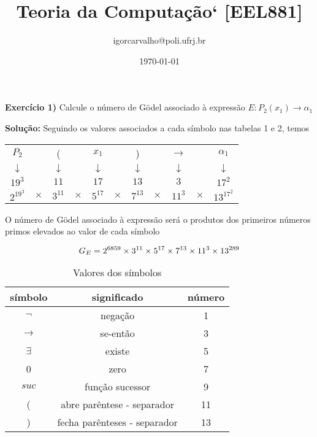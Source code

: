 \documentclass{article}
\title{Teoria da Computação` [EEL881]}
\author{igorcarvalho@poli.ufrj.br}
\date{\today}
\begin{document}
\maketitle

\noindent \textbf{Exercício 1)} Calcule o número de Gödel associado à expressão $E: P_2(x_1) \to \alpha_1$

\hspace{0pt}

\noindent \textbf{Solução:} Seguindo os valores associados a cada símbolo nas tabelas 1 e 2, temos

\begin{center}
    \begin{tabular}{ccccccccccc}
        $P_2$ & & ( & & $x_1$ & & ) & & $\to$ & & $\alpha_1$\\
        $\downarrow$ & & $\downarrow$ & & $\downarrow$ & & $\downarrow$ & & $\downarrow$ & & $\downarrow$\\
        $19^3$ & & $11$ & & $17$ & & $13$ & & $3$ & & $17^2$\\
        $2^{19^3}$ & $\times$ & $3^{11}$ & $\times$ & $5^{17}$ & $\times$ & $7^{13}$ & $\times$ & $11^{3}$ & $\times$ & $13^{17^2}$\\
    \end{tabular}
\end{center}

O número de Gödel associado à expressão será o produtos dos primeiros números primos elevados ao valor de cada símbolo

\[
G_E = 2^{6859} \times 3^{11} \times 5^{17} \times 7^{13} \times 11^{3} \times 13^{289}\\
\]

\newpage

\begin{table}[!h]
    \centering
    \begin{tabular}{c|c|c}
        \textbf{símbolo} & \textbf{significado} & \textbf{número}\\
        \hline
        $\lnot$ & negação & 1\\
        $\to$ & se-então & 3\\
        $\exists$ & existe & 5\\
        0 & zero & 7\\
        $suc$ & função sucessor & 9\\
        ( & abre parêntese - separador & 11\\
        ) & fecha parênteses - separador & 13\\
    \end{tabular}
    \caption{Valores dos símbolos}
\end{table}
\end{document}
